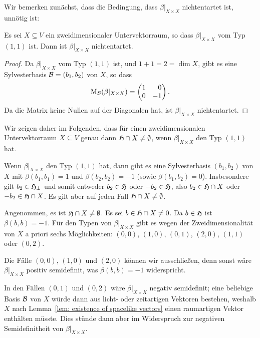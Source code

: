 \documentclass[a4paper,10pt,numbers=noenddot]{scrartcl}
\begin{document}
\subsection{}


Wir bemerken zunächst, dass die Bedingung, dass $\beta|_{X \times X}$ nichtentartet ist, unnötig ist:


\begin{lemma}
  Es sei $X \subseteq V$ ein zweidimensionaler Untervektorraum, so dass $\beta|_{X \times X}$ vom Typ $(1,1)$ ist.
  Dann ist $\beta|_{X \times X}$ nichtentartet.
\end{lemma}
\begin{proof}
  Da $\beta|_{X \times X}$ vom Typ $(1,1)$ ist, und $1 + 1 = 2 = \dim X$, gibt es eine Sylvesterbasis $\mathcal{B} = (b_1, b_2)$ von $X$, so dass
  \[
    \Mat_\mc{B}(\beta|_{X \times X})
    =
    \begin{pmatrix*}[r]
      1 &  0  \\
      0 & -1
    \end{pmatrix*}.
  \]
  Da die Matrix keine Nullen auf der Diagonalen hat, ist $\beta|_{X \times X}$ nichtentartet.
\end{proof}


Wir zeigen daher im Folgenden, dass für einen zweidimensionalen Untervektorraum $X \subseteq V$ genau dann $\mathfrak{H} \cap X \neq \emptyset$, wenn $\beta|_{X \times X}$ den Typ $(1,1)$ hat.

Wenn $\beta|_{X \times X}$ den Typ $(1,1)$ hat, dann gibt es eine Sylvesterbasis $(b_1, b_2)$ von $X$ mit $\beta(b_1, b_1) = 1$ und $\beta(b_2, b_2) = -1$ (sowie $\beta(b_1, b_2) = 0$).
Insbesondere gilt $b_2 \in \mathfrak{H}_{\pm}$ und somit entweder $b_2 \in \mathfrak{H}$ oder $-b_2 \in \mathfrak{H}$, also $b_2 \in \mathfrak{H} \cap X$ oder $-b_2 \in \mathfrak{H} \cap X$.
Es gilt aber auf jeden Fall $\mathfrak{H} \cap X \neq \emptyset$.

Angenommen, es ist $\mathfrak{H} \cap X \neq \emptyset$.
Es sei $b \in \mathfrak{H} \cap X \neq 0$.
Da $b \in \mathfrak{H}$ ist $\beta(b,b) = -1$.
Für den Typen von $\beta|_{X \times X}$ gibt es wegen der Zweidimensionalität von $X$ a priori sechs Möglichkeiten: $(0,0)$, $(1,0)$, $(0,1)$, $(2,0)$, $(1,1)$ oder $(0,2)$.

Die Fälle $(0,0)$, $(1,0)$ und $(2,0)$ können wir ausschließen, denn sonst wäre $\beta|_{X \times X}$ positiv semidefinit, was $\beta(b,b) = -1$ widerspricht.

In den Fällen $(0,1)$ und $(0,2)$ wäre $\beta|_{X \times X}$ negativ semidefinit; eine beliebige Basis $\mathcal{B}$ von $X$ würde dann aus licht- oder zeitartigen Vektoren bestehen, weshalb $X$ nach Lemma~\ref{lem: existence of spacelike vectors} einen raumartigen Vektor enthälten müsste.
Dies stünde dann aber im Widerspruch zur negativen Semidefinitheit von $\beta|_{X \times X}$.
\end{document}
